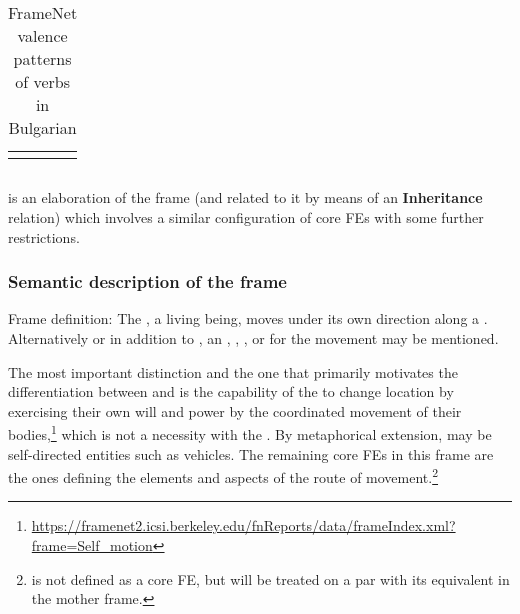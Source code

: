 \documentclass[output=paper,colorlinks,citecolor=brown]{langscibook}
\begin{document}
\begin{table}
\begin{tabularx}{\textwidth}{lrQ}
\lspbottomrule
\end{tabularx}
    \caption{FrameNet valence patterns of  verbs in Bulgarian}
    \label{tab:4:motion-valence-bg}
\end{table}


\subsection{}

 is an elaboration of the  frame (and related to it by means of an \textbf{Inheritance} relation) which involves a similar configuration of core FEs with some further restrictions. 

\subsubsection{Semantic description of the  frame}

Frame definition: The , a living being, moves under its own direction along a . Alternatively or in addition to , an , , , or  for the movement may be mentioned.

The most important distinction and the one that primarily motivates the differentiation between  and  is the capability of the  to change location by exercising their own will and power by the coordinated movement of their bodies,\footnote{\url{https://framenet2.icsi.berkeley.edu/fnReports/data/frameIndex.xml?frame=Self_motion}} which is not a necessity with the  . By metaphorical extension,  may be self-directed entities such as vehicles. %
The remaining core FEs in this frame are the ones defining the elements and aspects of the route of movement.\footnote{ is not defined as a core FE, but will be treated on a par with its equivalent in the mother frame.} %
\end{document}

